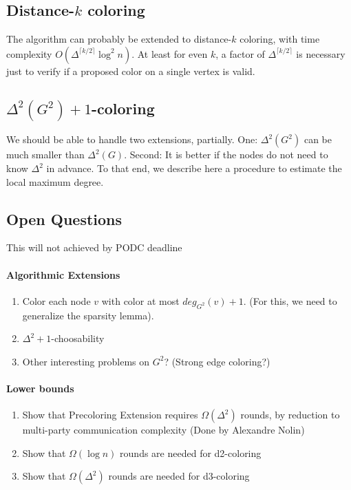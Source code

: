 \subsection{Distance-$k$ coloring}

The algorithm can probably be extended to distance-$k$ coloring, with time complexity $O(\Delta^{\lceil k/2\rceil} \log^2 n)$. 
At least for even $k$, a factor of $\Delta^{\lceil k/2\rceil}$ is necessary just to verify if a proposed color on a single vertex is valid.


\subsection{$\Delta^2(G^2)+1$-coloring }

We should be able to handle two extensions, partially.
One: $\Delta^2(G^2)$ can be much smaller than $\Delta^2(G)$. Second: It is better if the nodes do not need to know $\Delta^2$ in advance.
To that end, we describe here a procedure to estimate the local maximum degree.


\subsection{Open Questions}
This will not achieved by PODC deadline

\paragraph{Algorithmic Extensions}
\begin{enumerate}
    \item Color each node $v$ with color at most $deg_{G^2}(v)+1$. (For this, we need to generalize the sparsity lemma).
    \item $\Delta^2+1$-choosability
    \item Other interesting problems on $G^2$? (Strong edge coloring?)
\end{enumerate}
\paragraph{Lower bounds}
\begin{enumerate}
    \item Show that Precoloring Extension requires $\Omega(\Delta^2)$ rounds, by reduction to multi-party communication complexity (Done by Alexandre Nolin)
    \item Show that $\Omega(\log n)$ rounds are needed for d2-coloring
    \item Show that $\Omega(\Delta^2)$ rounds are needed for d3-coloring
\end{enumerate}

